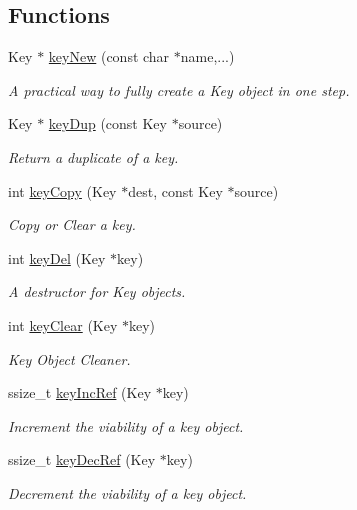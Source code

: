 \subsection*{Functions}
\begin{DoxyCompactItemize}
\item 
Key $\ast$ \hyperlink{group__key_gad23c65b44bf48d773759e1f9a4d43b89}{key\+New} (const char $\ast$name,...)
\begin{DoxyCompactList}\small\item\em A practical way to fully create a Key object in one step. \end{DoxyCompactList}\item 
Key $\ast$ \hyperlink{group__key_gae6ec6a60cc4b8c1463fa08623d056ce3}{key\+Dup} (const Key $\ast$source)
\begin{DoxyCompactList}\small\item\em Return a duplicate of a key. \end{DoxyCompactList}\item 
int \hyperlink{group__key_ga6a12cbbe656a1ad9f41b8c681d7a2f92}{key\+Copy} (Key $\ast$dest, const Key $\ast$source)
\begin{DoxyCompactList}\small\item\em Copy or Clear a key. \end{DoxyCompactList}\item 
int \hyperlink{group__key_ga3df95bbc2494e3e6703ece5639be5bb1}{key\+Del} (Key $\ast$key)
\begin{DoxyCompactList}\small\item\em A destructor for Key objects. \end{DoxyCompactList}\item 
int \hyperlink{group__key_gab2242311a36bbc0520e0d36895107ec1}{key\+Clear} (Key $\ast$key)
\begin{DoxyCompactList}\small\item\em Key Object Cleaner. \end{DoxyCompactList}\item 
ssize\+\_\+t \hyperlink{group__key_ga6970a6f254d67af7e39f8e469bb162f1}{key\+Inc\+Ref} (Key $\ast$key)
\begin{DoxyCompactList}\small\item\em Increment the viability of a key object. \end{DoxyCompactList}\item 
ssize\+\_\+t \hyperlink{group__key_ga2c6433ca22109e4e141946057eccb283}{key\+Dec\+Ref} (Key $\ast$key)
\begin{DoxyCompactList}\small\item\em Decrement the viability of a key object. \end{DoxyCompactList}\item 

\end{DoxyCompactItemize}
